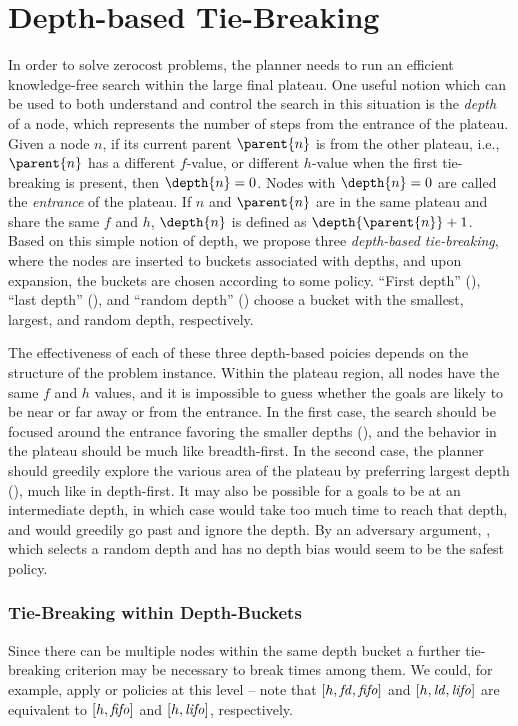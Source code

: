 \section{Depth-based Tie-Breaking}

In order to solve zerocost problems, the planner needs to run an
efficient knowledge-free search within the large final plateau.
One useful notion which can be used to both understand and control the
search in this situation is the \emph{depth} of a node, which represents
the number of steps from the entrance of the plateau.  Given a node $n$,
if its current parent $\parent{n}$ is from the other plateau, i.e.,
$\parent{n}$ has a different $f$-value, or different $h$-value when the
first tie-breaking is present, then $\depth{n} = 0$. Nodes with
$\depth{n} = 0$ are called the \emph{entrance} of the plateau.  If $n$
and $\parent{n}$ are in the same plateau and share the same $f$ and $h$,
$\depth{n}$ is defined as $\depth{\parent{n}} + 1$.  Based on this
simple notion of depth, we propose three \emph{depth-based
tie-breaking}, where the nodes are inserted to buckets associated with
depths, and upon expansion, the buckets are chosen according to some policy.
``First depth'' (\fd), ``last depth'' (\ld), and ``random depth'' (\rd) 
choose a bucket with the smallest,
largest, and random depth, respectively.

The effectiveness of each of these three depth-based poicies depends on the
structure of the problem instance.  Within
the plateau region, all nodes have the same $f$ and $h$ values, 
and it is impossible to guess whether the goals are likely to be  near or far
away or from the entrance.  In the first case, the
search should be focused around the entrance favoring the smaller depths
(\fd), and the behavior in the plateau should be much like breadth-first. In the
second case, the planner should greedily explore the various area of the
plateau by preferring largest depth (\ld), much like in
depth-first. 
It may also be possible for a goals to be at an intermediate depth, in which case
\fd would take too much time to reach that
depth, and \ld would greedily go past and ignore the depth.
By an adversary argument, \rd, which selects a random depth and has no depth bias would seem to be the safest policy.


\subsubsection{Tie-Breaking within Depth-Buckets} %
Since there can be multiple nodes within the same depth bucket
a further tie-breaking criterion may be necessary to break times among them.
We could, for example, apply \lifo or \fifo policies at this level -- 
note that $[h,\mbox{\textit{fd}},\mbox{\textit{fifo}}]$ and $[h,\mbox{\textit{ld}},\mbox{\textit{lifo}}]$ are equivalent to $[h,\mbox{\textit{fifo}}]$ and $[h,\mbox{\textit{lifo}}]$, respectively.

